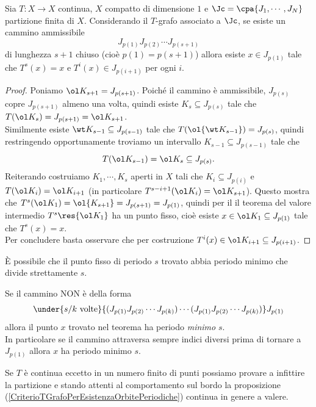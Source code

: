 \begin{proposition}\label{CriterioTGrafoPerEsistenzaOrbitePeriodiche}
Sia $T:X\to X$ continua, $X$ compatto di dimensione $1$ e $\Jc=\cpa{J_1,\cdots, J_N}$ partizione finita di $X$. Considerando il $T$-grafo associato a $\Jc$, se esiste un cammino ammissibile 
\[J_{p(1)}J_{p(2)}\cdots J_{p(s+1)}\] 
di lunghezza $s+1$ chiuso (cio\`e $p(1)=p(s+1)$) allora esiste $x\in J_{p(1)}$ tale che $T^s(x)=x$ e $T^i(x)\in J_{p(i+1)}$ per ogni $i$.
\end{proposition}
\begin{proof}
Poniamo $\ol K_{s+1}=J_{p(s+1)}$. Poich\'e il cammino \`e ammissibile, $J_{p(s)}$ copre $J_{p(s+1)}$ almeno una volta, quindi esiste $K_s\subseteq J_{p(s)}$ tale che $T(\ol K_s)=J_{p(s+1)}=\ol K_{s+1}$.\\
Similmente esiste $\wt K_{s-1}\subseteq J_{p(s-1)}$ tale che $T(\ol{\wt K_{s-1}})=J_{p(s)}$, quindi restringendo opportunamente troviamo un intervallo $K_{s-1}\subseteq J_{p(s-1)}$ tale che 
\[T(\ol K_{s-1})=\ol K_s\subseteq J_{p(s)}.\]
Reiterando costruiamo $K_1,\cdots, K_s$ aperti in $X$ tali che $K_i\subseteq J_{p(i)}$ e $T(\ol K_i)=\ol K_{i+1}$ (in particolare $T^{s-i+1}(\ol K_i)=\ol K_{s+1}$). Questo mostra che $T^s(\ol K_1)=\ol{K_{s+1}}=J_{p(s+1)}=J_{p(1)}$, quindi per il il teorema del valore intermedio $T^s\res{\ol K_1}$ ha un punto fisso, cio\`e esiste $x\in \ol K_1\subseteq J_{p(1)}$ tale che $T^s(x)=x$.\\
Per concludere basta osservare che per costruzione $T^i(x)\in \ol K_{i+1}\subseteq J_{p(i+1)}$.
\end{proof}
\begin{remark}
\`E possibile che il punto fisso di periodo $s$ trovato abbia periodo minimo che divide strettamente $s$.
\end{remark}
\begin{remark}\label{CriterioEsistenzaPeriodiMinimi}
Se il cammino NON \`e della forma
\[\under{s/k\text{ volte}}{(J_{p(1)}J_{p(2)}\cdots J_{p(k)}) \cdots (J_{p(1)}J_{p(2)}\cdots J_{p(k)})}J_{p(1)}\]
allora il punto $x$ trovato nel teorema ha periodo \textit{minimo} $s$.\\
In particolare se il cammino attraversa sempre indici diversi prima di tornare a $J_{p(1)}$ allora $x$ ha periodo minimo $s$. 
\end{remark}
\begin{remark}
Se $T$ \`e continua eccetto in un numero finito di punti possiamo provare a infittire la partizione e stando attenti al comportamento sul bordo la proposizione (\ref{CriterioTGrafoPerEsistenzaOrbitePeriodiche}) continua in genere a valere.
\end{remark}

